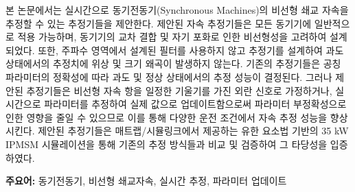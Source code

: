 본 논문에서는 실시간으로 동기전동기(Synchronous Machines)의 비선형 쇄교 자속을 추정할 수 있는 추정기들을 제안한다. 제안된 자속 추정기들은 모든 동기기에 일반적으로 적용 가능하며, 동기기의 교차 결합 및 자기 포화로 인한 비선형성을 고려하여 설계되었다. 또한, 주파수 영역에서 설계된 필터를 사용하지 않고 추정기를 설계하여 과도 상태에서의 추정치에 위상 및 크기 왜곡이 발생하지 않는다. 기존의 추정기들은 공칭 파라미터의 정확성에 따라 과도 및 정상 상태에서의 추정 성능이 결정된다. 그러나 제안된 추정기들은 비선형 자속 항을 일정한 기울기를 가진 외란 신호로 가정하거나, 실시간으로 파라미터를 추정하여 실제 값으로 업데이트함으로써 파라미터 부정확성으로 인한 영향을 줄일 수 있으므로 이를 통해 다양한 운전 조건에서 자속 추정 성능을 향상시킨다. 제안된 추정기들은 매트랩/시뮬링크에서 제공하는 유한 요소법 기반의 35 kW IPMSM 시뮬레이션을 통해 기존의 추정 방식들과 비교 및 검증하여 그 타당성을 입증하였다.

\textbf{주요어:} 동기전동기, 비선형 쇄교자속, 실시간 추정, 파라미터 업데이트 
